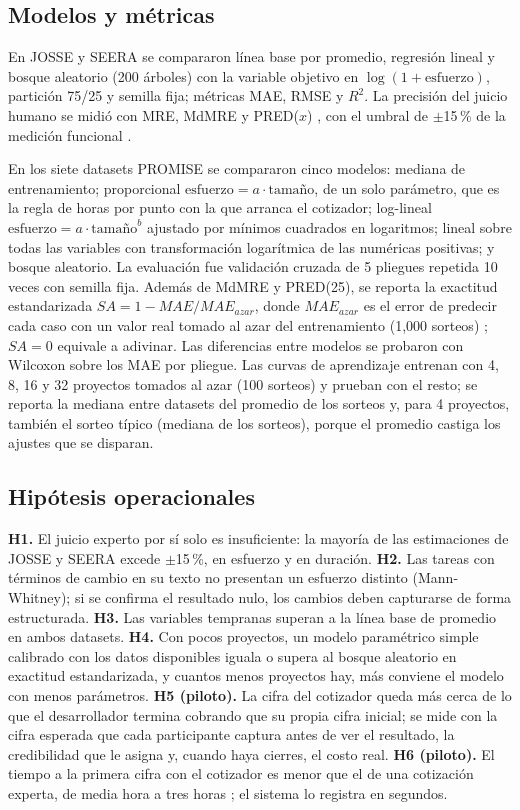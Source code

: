 \documentclass[10pt,twocolumn]{article}
\begin{document}
\subsection{Modelos y métricas}
En JOSSE y SEERA se compararon línea base por promedio, regresión lineal y bosque aleatorio (200 árboles) con la variable objetivo en $\log(1+\text{esfuerzo})$, partición 75/25 y semilla fija; métricas MAE, RMSE y $R^2$. La precisión del juicio humano se midió con MRE, MdMRE y PRED($x$) \cite{conte1986}, con el umbral de $\pm$15\,\% de la medición funcional \cite{ifpug2010}.

En los siete datasets PROMISE se compararon cinco modelos: mediana de entrenamiento; proporcional $\text{esfuerzo}=a\cdot\text{tamaño}$, de un solo parámetro, que es la regla de horas por punto con la que arranca el cotizador; log-lineal $\text{esfuerzo}=a\cdot\text{tamaño}^{b}$ ajustado por mínimos cuadrados en logaritmos; lineal sobre todas las variables con transformación logarítmica de las numéricas positivas; y bosque aleatorio. La evaluación fue validación cruzada de 5 pliegues repetida 10 veces con semilla fija. Además de MdMRE y PRED(25), se reporta la exactitud estandarizada $SA = 1 - MAE/MAE_{azar}$, donde $MAE_{azar}$ es el error de predecir cada caso con un valor real tomado al azar del entrenamiento (1{,}000 sorteos) \cite{shepperd2012evaluating}; $SA=0$ equivale a adivinar. Las diferencias entre modelos se probaron con Wilcoxon sobre los MAE por pliegue. Las curvas de aprendizaje entrenan con 4, 8, 16 y 32 proyectos tomados al azar (100 sorteos) y prueban con el resto; se reporta la mediana entre datasets del promedio de los sorteos y, para 4 proyectos, también el sorteo típico (mediana de los sorteos), porque el promedio castiga los ajustes que se disparan.

\subsection{Hipótesis operacionales}
\textbf{H1.} El juicio experto por sí solo es insuficiente: la mayoría de las estimaciones de JOSSE y SEERA excede $\pm$15\,\%, en esfuerzo y en duración.
\textbf{H2.} Las tareas con términos de cambio en su texto no presentan un esfuerzo distinto (Mann-Whitney); si se confirma el resultado nulo, los cambios deben capturarse de forma estructurada.
\textbf{H3.} Las variables tempranas superan a la línea base de promedio en ambos datasets.
\textbf{H4.} Con pocos proyectos, un modelo paramétrico simple calibrado con los datos disponibles iguala o supera al bosque aleatorio en exactitud estandarizada, y cuantos menos proyectos hay, más conviene el modelo con menos parámetros.
\textbf{H5 (piloto).} La cifra del cotizador queda más cerca de lo que el desarrollador termina cobrando que su propia cifra inicial; se mide con la cifra esperada que cada participante captura antes de ver el resultado, la credibilidad que le asigna y, cuando haya cierres, el costo real.
\textbf{H6 (piloto).} El tiempo a la primera cifra con el cotizador es menor que el de una cotización experta, de media hora a tres horas \cite{bonilla2017diseno}; el sistema lo registra en segundos.
\end{document}
